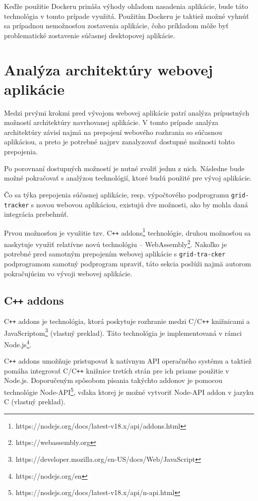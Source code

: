 Keďže použitie Dockeru prináša výhody ohľadom nasadenia aplikácie, bude táto technológia v tomto prípade využitá. Použitím Dockeru je taktiež možné vyhnúť sa prípadnou nemožnosťou zostavenia aplikácie, čoho príkladom môže byť problematické zostavenie súčasnej desktopovej aplikácie.

\section {Analýza architektúry webovej aplikácie}
Medzi prvými krokmi pred vývojom webovej aplikácie patrí analýza prípustných možností architektúry navrhovanej aplikácie. V tomto prípade analýza architektúry závisí najmä na prepojení webového rozhrania so súčasnou aplikáciou, a preto je potrebné najprv zanalyzovať dostupné možnosti tohto prepojenia.

Po porovnaní dostupných možností je nutné zvoliť jednu z nich. Následne bude možné pokračovať s analýzou technológií, ktoré budú použité pre vývoj aplikácie.

Čo sa týka prepojenia súčasnej aplikácie, resp. výpočtového podprogramu \texttt{grid-tracker} s novou webovou aplikáciou, existujú dve možnosti, ako by mohla daná integrácia prebehnúť.

Prvou možnosťou je využitie tzv. C\texttt{++} addons\footnote{https://nodejs.org/docs/latest-v18.x/api/addons.html} technológie, druhou možnosťou sa naskytuje využiť relatívne novú technológiu -- WebAssembly\footnote{https://webassembly.org}. Nakoľko je potrebné pred samotným prepojením webovej aplikácie s \texttt{grid-tra-\newline cker} podprogramom samotný podprogram upraviť, táto sekcia poslúži najmä autorom pokračujúcim vo vývoji webovej aplikácie. 

\subsection {C\texttt{++} addons}
C\texttt{++} addons je technológia, ktorá poskytuje rozhranie medzi C/C\texttt{++} knižnicami a JavaScriptom\footnote{https://developer.mozilla.org/en-US/docs/Web/JavaScript} \cite{cpp_addons} (vlastný preklad). Táto technológia je implementovaná v rámci Node.js\footnote{https://nodejs.org/en}.

C\texttt{++} addons umožňuje pristupovať k natívnym API operačného systému a taktiež pomáha integrovať C/C\texttt{++} knižnice tretích strán pre ich priame použitie v Node.js. Doporučeným spôsobom písania takýchto addonov je pomocou technológie Node-API\footnote{https://nodejs.org/docs/latest-v18.x/api/n-api.html}, vďaka ktorej je možné vytvoriť Node-API addon v jazyku C \cite{cpp_addons} (vlastný preklad).

